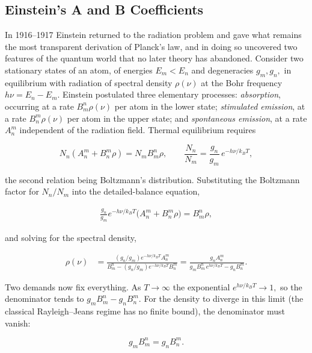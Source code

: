 \subsection{Einstein's A and B Coefficients}
\label{subsec:einsteinAB}
In 1916--1917 Einstein returned to the radiation problem and gave what remains the most transparent derivation of Planck's law, and in doing so uncovered two features of the quantum world that no later theory has abandoned. Consider two stationary states of an atom, of energies $E_m<E_n$ and degeneracies $g_m,g_n,$ in equilibrium with radiation of spectral density $\rho(\nu)$ at the Bohr frequency $h\nu=E_n-E_m.$ Einstein postulated three elementary processes: \emph{absorption}, occurring at a rate $B_m^n\rho(\nu)$ per atom in the lower state; \emph{stimulated emission}, at a rate $B_n^m\rho(\nu)$ per atom in the upper state; and \emph{spontaneous emission}, at a rate $A_n^m$ independent of the radiation field. Thermal equilibrium requires
\begin{linenomath}
    \begin{equation}
        N_n\left(A_n^m+B_n^m\rho\right)=N_m B_m^n\rho,
        \qquad
        \frac{N_n}{N_m}=\frac{g_n}{g_m}\,e^{-h\nu/k_BT},
    \end{equation}
\end{linenomath}
the second relation being Boltzmann's distribution. Substituting the Boltzmann factor for $N_n/N_m$ into the detailed-balance equation,
\begin{linenomath}
    \begin{align}
        \frac{g_n}{g_m}e^{-h\nu/k_BT}\bigl(A_n^m+B_n^m\rho\bigr)=B_m^n\rho,
    \end{align}
\end{linenomath}
and solving for the spectral density,
\begin{linenomath}
    \begin{align}
        \rho(\nu)
        &=\frac{(g_n/g_m)e^{-h\nu/k_BT}A_n^m}{B_m^n-(g_n/g_m)e^{-h\nu/k_BT}B_n^m}
         =\frac{g_nA_n^m}{g_mB_m^n\,e^{h\nu/k_BT}-g_nB_n^m}.
    \end{align}
\end{linenomath}
Two demands now fix everything. As $T\to\infty$ the exponential $e^{h\nu/k_BT}\to1,$ so the denominator tends to $g_mB_m^n-g_nB_n^m.$ For the density to diverge in this limit (the classical Rayleigh--Jeans regime has no finite bound), the denominator must vanish:
\begin{linenomath}
    \begin{equation}
        g_mB_m^n=g_nB_n^m.
    \end{equation}
\end{linenomath}
